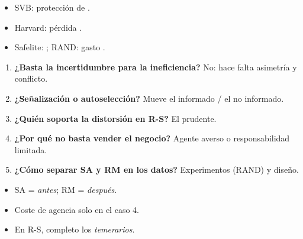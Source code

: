 \documentclass{article}
\begin{document}
\begin{columnas}
\anexorepaso
{}
\begin{itemize}
\item SVB: protección de .
\item Harvard: pérdida .
\item Safelite: ; RAND: gasto .
\end{itemize}
\begin{enumerate}
\item \textbf{¿Basta la incertidumbre para la ineficiencia?} No: hace falta asimetría y conflicto.
\item \textbf{¿Señalización o autoselección?} Mueve el informado / el no informado.
\item \textbf{¿Quién soporta la distorsión en R-S?} El prudente.
\item \textbf{¿Por qué no basta vender el negocio?} Agente averso o responsabilidad limitada.
\item \textbf{¿Cómo separar SA y RM en los datos?} Experimentos (RAND) y diseño.
\end{enumerate}
\begin{trampa}
\begin{itemize}
\item SA = \emph{antes}; RM = \emph{después}.
\item Coste de agencia solo en el caso 4.
\item En R-S, completo los \emph{temerarios}.
\end{itemize}
\end{trampa}

\end{columnas}
\end{document}
